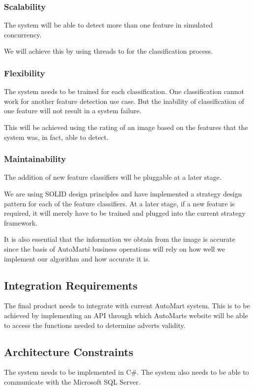 \subsubsection{Scalability}
The system will be able to detect more than one feature in simulated concurrency.

We will achieve this by using threads to for the classification process.
\subsubsection{Flexibility}
The system needs to be trained for each classification. One classification cannot work for another feature detection use case. But the inability of classification of one feature will not result in a system failure. 

This will be achieved using the rating of an image based on the features that the system was, in fact, able to detect.
\subsubsection{Maintainability}
The addition of new feature classifiers will be pluggable at a later stage. 

We are using SOLID design principles and have implemented a strategy design pattern for each of the feature classifiers. At a later stage, if a new feature is required, it will merely have to be trained and plugged into the current strategy framework.

It is also essential that the information we obtain from the image is accurate since the basis of AutoMart\'s business operations will rely on how well we implement our algorithm and how accurate it is.

\subsection{Integration Requirements}
The final product needs to integrate with current AutoMart system. This is to be achieved by implementing an API through which AutoMarts website will be able to access the functions needed to determine adverts validity.

\subsection{Architecture Constraints}
The system needs to be implemented in C\#. The system also needs to be able to communicate with the Microsoft SQL Server.
